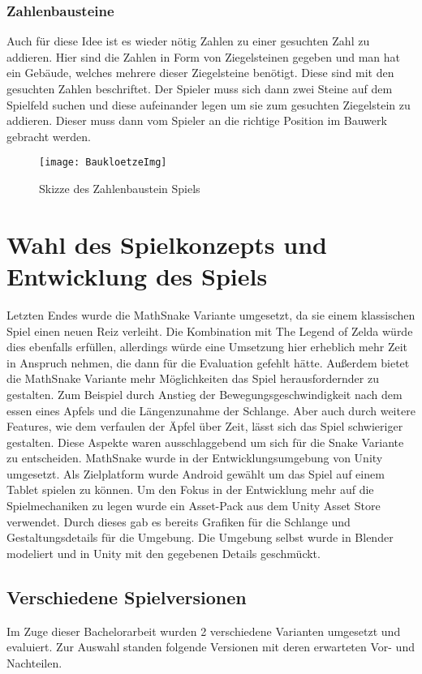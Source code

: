 \subsubsection{Zahlenbausteine}
Auch für diese Idee ist es wieder nötig Zahlen zu einer gesuchten Zahl zu addieren. Hier sind die Zahlen in Form von Ziegelsteinen gegeben und man hat ein Gebäude, welches mehrere dieser Ziegelsteine benötigt. Diese sind mit den gesuchten Zahlen beschriftet. Der Spieler muss sich dann zwei Steine auf dem Spielfeld suchen und diese aufeinander legen um sie zum gesuchten Ziegelstein zu addieren. Dieser muss dann vom Spieler an die richtige Position im Bauwerk gebracht werden.
\begin{figure}[htb]
	\centering
	\texttt{[image: BaukloetzeImg]}
	\caption{Skizze des Zahlenbaustein Spiels\label{fig:baustein}}
\end{figure}
\section{Wahl des Spielkonzepts und Entwicklung des Spiels}
Letzten Endes wurde die MathSnake Variante umgesetzt, da sie einem klassischen Spiel einen neuen Reiz verleiht. Die Kombination mit The Legend of Zelda würde dies ebenfalls erfüllen, allerdings würde eine Umsetzung hier erheblich mehr Zeit in Anspruch nehmen, die dann für die Evaluation gefehlt hätte. Außerdem bietet die MathSnake Variante mehr Möglichkeiten das Spiel herausfordernder zu gestalten. Zum Beispiel durch Anstieg der Bewegungsgeschwindigkeit nach dem essen eines Apfels und die Längenzunahme der Schlange. Aber auch durch weitere Features, wie dem verfaulen der Äpfel über Zeit, lässt sich das Spiel schwieriger gestalten. Diese Aspekte waren ausschlaggebend um sich für die Snake Variante zu entscheiden.
MathSnake wurde in der Entwicklungsumgebung von Unity umgesetzt. Als Zielplatform wurde Android gewählt um das Spiel auf einem Tablet spielen zu können. Um den Fokus in der Entwicklung mehr auf die Spielmechaniken zu legen wurde ein Asset-Pack aus dem Unity Asset Store verwendet. Durch dieses gab es bereits Grafiken für die Schlange und Gestaltungsdetails für die Umgebung. Die Umgebung selbst wurde in Blender modeliert und in Unity mit den gegebenen Details geschmückt.
\subsection{Verschiedene Spielversionen}
Im Zuge dieser Bachelorarbeit wurden 2 verschiedene Varianten umgesetzt und evaluiert. Zur Auswahl standen folgende Versionen mit deren erwarteten Vor- und Nachteilen.

